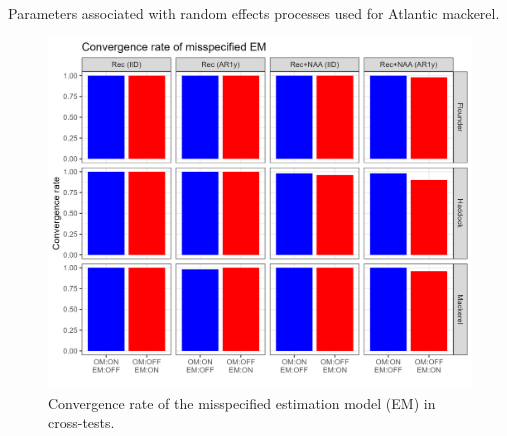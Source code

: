 \documentclass[
  12pt,
]{article}
\begin{document}
\begin{table}[H]
    \centering
    \caption{Parameters associated with random effects processes used for Atlantic mackerel.}
    \label{supp_mackerel_table}
    
\end{table}

\renewcommand{\thetable}{\arabic{table}}

\renewcommand{\thefigure}{S\arabic{figure}}
\setcounter{figure}{0}

\begin{figure}[H]
    \centering
    \includegraphics[width=\textwidth]{Original_Figures&Tables/Convergence.PNG}
    \caption{Convergence rate of the misspecified estimation model (EM) in cross-tests.}
    \label{fig:supp_conv}
\end{figure}
\end{document}
